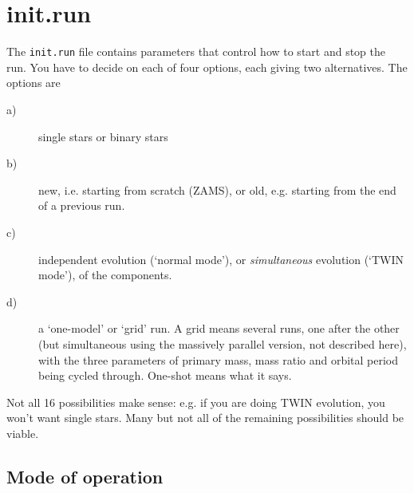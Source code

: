 \hypertarget{initrun}{}
\section{init.run}
\label{sec:initrun}

The \texttt{init.run} file contains parameters that control how to start and stop the run. 
You have to decide on each of four options, each giving two alternatives. The options are
\begin{description}
\item[a)] single stars or binary stars
\item[b)] new, i.e. starting from scratch (ZAMS), or old, e.g. starting from the end
of a previous run.
\item[c)] independent evolution (`normal mode'), or \emph{simultaneous} evolution (`TWIN mode'), of the components.
\item[d)] a `one-model' or `grid' run. A grid
  means several runs, one after the other (but simultaneous using the massively
  parallel version, not described here), with the three parameters of primary mass, 
  mass ratio and orbital period being cycled through. One-shot means what it says.
\end{description}

Not all 16 possibilities make sense: e.g. if you are doing TWIN evolution,
you won't want single stars. Many but not all of the remaining possibilities should 
be viable.


\subsection{Mode of operation}
